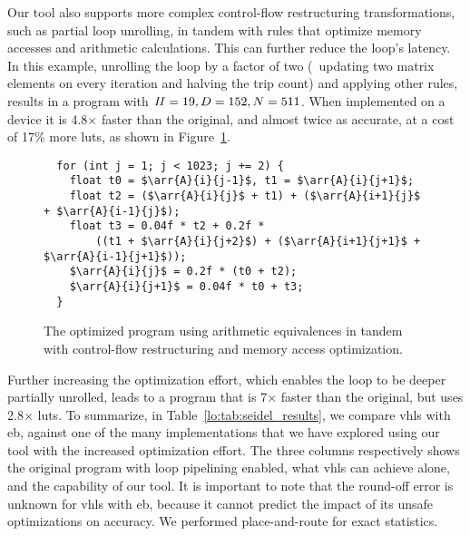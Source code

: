 Our tool also supports more complex control-flow restructuring transformations,
such as partial loop unrolling, in tandem with rules that optimize memory
accesses and arithmetic calculations.  This can further reduce the loop's
latency.  In this example, unrolling the loop by a factor of two (\ie~updating
two matrix elements on every iteration and halving the trip count) and applying
other rules, results in a program with $\mathit{II} = 19, D = 152, N = 511$.  When
implemented on a device it is 4.8$\times$ faster than the original, and
almost twice as accurate, at a cost of 17\% more \glspl{lut}, as shown in
Figure~\ref{lo:fig:seidel_prog_3}.

\begin{figure}[ht]
\begin{lstlisting}
  for (int j = 1; j < 1023; j += 2) {
    float t0 = $\arr{A}{i}{j-1}$, t1 = $\arr{A}{i}{j+1}$;
    float t2 = ($\arr{A}{i}{j}$ + t1) + ($\arr{A}{i+1}{j}$ + $\arr{A}{i-1}{j}$);
    float t3 = 0.04f * t2 + 0.2f *
        ((t1 + $\arr{A}{i}{j+2}$) + ($\arr{A}{i+1}{j+1}$ + $\arr{A}{i-1}{j+1}$));
    $\arr{A}{i}{j}$ = 0.2f * (t0 + t2);
    $\arr{A}{i}{j+1}$ = 0.04f * t0 + t3;
  }
\end{lstlisting}
    \caption{The optimized program using arithmetic equivalences in tandem with
    control-flow restructuring and memory access optimization.}
    \label{lo:fig:seidel_prog_3}
\end{figure}

Further increasing the optimization effort, which enables the loop to be
deeper partially unrolled, leads to a program that is 7$\times$ faster
than the original, but uses 2.8$\times$ \glspl{lut}.  To summarize, in
Table~\ref{lo:tab:seidel_results}, we compare \gls{vhls} with \gls{eb}, against
one of the many implementations that we have explored using our tool with
the increased optimization effort.  The three columns respectively shows the
original program with loop pipelining enabled, what \gls{vhls} can achieve
alone, and the capability of our tool.  It is important to note that the
round-off error is unknown for \gls{vhls} with \gls{eb}, because it cannot
predict the impact of its unsafe optimizations on accuracy.  We performed
place-and-route for exact statistics.

